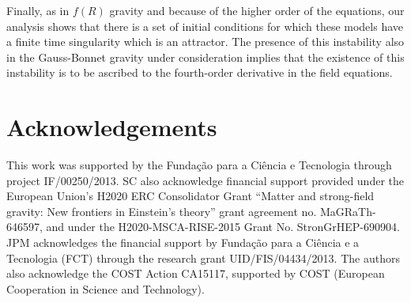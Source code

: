 \documentclass[a4paper,aps,onecolumn,nofootinbib]{revtex4}
\begin{document}
Finally, as in $f(R)$ gravity  and because of the higher order of the equations, our analysis shows that there is a set of initial conditions for which these models have a finite time singularity which is an attractor. The presence of this instability also in the Gauss-Bonnet gravity under consideration  implies that the existence  of this instability is to be ascribed to the fourth-order derivative in the field equations. 

\section*{Acknowledgements}
This work was supported by  the Funda\c{c}\~{a}o para a Ci\^{e}ncia e Tecnologia through project IF/00250/2013.  SC also acknowledge financial support provided under the European Union's H2020 ERC Consolidator Grant ``Matter and strong-field gravity: New frontiers in Einstein's theory'' grant agreement no.  MaGRaTh-646597, and under the H2020-MSCA-RISE-2015 Grant No. StronGrHEP-690904. JPM  acknowledges the financial  support by Funda\c{c}\~ao para a Ci\^encia e a Tecnologia (FCT) through the research grant UID/FIS/04434/2013. The authors also acknowledge the COST Action
CA15117, supported by COST (European Cooperation in Science and
Technology). 
\end{document}
